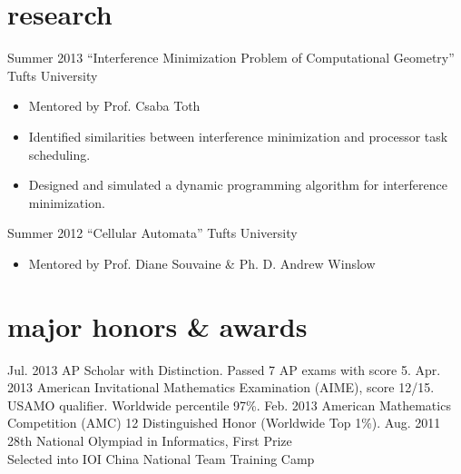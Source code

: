 \documentclass[]{friggeri-cv} %
\newenvironment{citemize}{\begin{itemize}[leftmargin=12pt]\vspace{-10pt}}{\end{itemize}}
\begin{document}

\section{research}

\begin{entrylist}
  \entry
  {Summer 2013}
  {``Interference Minimization Problem of Computational Geometry''}
  {Tufts University}
  {\begin{citemize}
    \item{Mentored by Prof. Csaba Toth}
    \item{Identified similarities between interference minimization and processor task scheduling. }
    \item{Designed and simulated a dynamic programming algorithm for interference minimization. }
  \end{citemize}}
  \entry
  {Summer 2012}
  {``Cellular Automata''}
  {Tufts University}
  {\begin{citemize}
    \item{Mentored by Prof. Diane Souvaine \& Ph. D. Andrew Winslow}
  \end{citemize}}
\end{entrylist}



\section{major honors \& awards}

\begin{entrylist}
  \centry
  {Jul. 2013}
  {AP Scholar with Distinction. Passed 7 AP exams with score 5. }
  \centry
  {Apr. 2013}
  {American Invitational Mathematics Examination (AIME), score 12/15. USAMO qualifier. Worldwide percentile 97\%. }
  \centry
  {Feb. 2013}
  {American Mathematics Competition (AMC) 12 Distinguished Honor (Worldwide Top 1\%). }
  \centry
  {Aug. 2011}
  {28th National Olympiad in Informatics, First Prize \\
  Selected into IOI China National Team Training Camp}
\end{entrylist}
\end{document}
